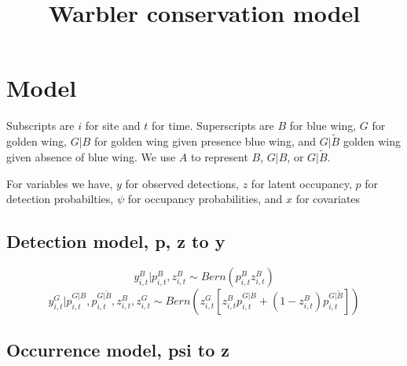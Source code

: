 \documentclass{article}
\title{Warbler conservation model}
\begin{document}
\maketitle

\section{Model}

Subscripts are $i$ for site and $t$ for time.  Superscripts are $B$
for blue wing, $G$ for golden wing, $G|B$ for golden wing given
presence blue wing, and $G|\tilde{B}$ golden wing given absence of
blue wing.  We use $A$ to represent $B$, $G|B$, or $G|\tilde{B}$.

For variables we have, $y$ for observed detections, $z$ for latent
occupancy, $p$ for detection probabilties, $\psi$ for occupancy
probabilities, and $x$ for covariates

\subsection{Detection model, p, z to y}

\begin{equation}
  \label{eq:1}
  y_{i,t}^B | p_{i,t}^B, z_{i,t}^B \sim Bern(p_{i,t}^B z_{i,t}^B)
\end{equation}
\begin{equation}
  \label{eq:2}
  y_{i,t}^G | p_{i,t}^{G|B}, p_{i,t}^{G|\tilde{B}}, z_{i,t}^B, z_{i,t}^G \sim Bern(z_{i,t}^G [z_{i,t}^B p_{i,t}^{G|B} + (1-z_{i,t}^B)p_{i,t}^{G|\tilde{B}}])
\end{equation}

\subsection{Occurrence model, psi to z}
\end{document}
